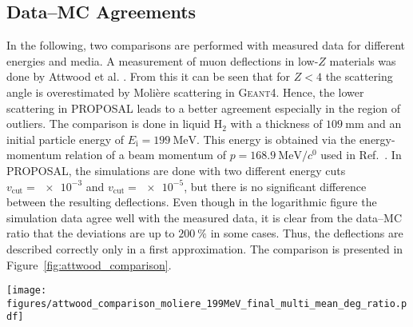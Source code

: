\subsection{Data--MC Agreements}
In the following, two comparisons are performed with measured data for 
different energies and media.
A measurement of muon deflections in low-$Z$ materials was done by Attwood et al. \cite{attwood_2006}. 
From this it can be seen that for $Z < 4$ the scattering angle is overestimated 
by Molière scattering in \textsc{Geant4}. Hence, the lower scattering in PROPOSAL leads 
to a better agreement especially in the region of outliers. The comparison is 
done in liquid $\text{H}_2$ with a thickness of $\SI{109}{\milli\meter}$ and an 
initial particle energy of $E_{\mathrm{i}} = \SI{199}{\mega\electronvolt}$. 
This energy is obtained via the energy-momentum relation of 
a beam momentum of $p = \SI[per-mode=symbol]{168.9}{\mega\electronvolt\per\clight}$
used in Ref.~\cite{attwood_2006}. 
In PROPOSAL, the simulations are done with two different energy cuts $v_{\mathrm{cut}} = \num{e-3}$ and $v_{\mathrm{cut}} = \num{e-5}$, 
but there is no significant difference between the resulting deflections.
Even though in the logarithmic figure the simulation data agree well 
with the measured data, it is clear from the data--MC ratio that the deviations 
are up to $\SI{200}{\percent}$ in some cases. Thus, the deflections are described 
correctly only in a first approximation.
The comparison is presented in Figure~\ref{fig:attwood_comparison}.

\begin{figure*}
    \centering 
    \texttt{[image: figures/attwood\_comparison\_moliere\_199MeV\_final\_multi\_mean\_deg\_ratio.pdf]}
    \caption{
    Muons are 
    propagated with $E_{\mathrm{i}} = \SI{199}{\mega\electronvolt}$ through 
    $\SI{109}{\milli\meter}$ of liquid $\text{H}_2$.
    Measured data of Attwood et al. and simulation data of \textsc{Geant4} are taken from Ref.~\cite{attwood_2006}.    
    The figure presents 
    the normalized counts in dependence of the projected scattering angle $\theta_{\mathrm{y}}$ in degree.
    In PROPOSAL, $100$ simulations each with $\num{e5}$ muons are performed for two different settings using the energy cut 
    $v_{\mathrm{cut}} = \num{e-5}$. The blue points present the mean of the simulations considering
    stochastic deflections and Molière scattering (MSM), the orange 
    points
    present the mean of the simulations taking into account only Molière scattering.   
    The uncertainties on the $x$--axis result due to the measured bin widths. The $y$--uncertainties are the standard deviations.   
    The deflections are  
    underestimated in PROPOSAL, except at $\theta_{\mathrm{y}} \approx 
    \SI{0}{\degree}$ and at $\theta_{\mathrm{y}} \approx 
    \SI{3}{\degree}$. At deflections $\SI{2}{\degree} < \theta_{\mathrm{y}} < \SI{5}{\degree}$, 
    the result seems to be more accurate than \textsc{Geant4}'s. The consideration of the stochastic deflections shows no significant influence.}
    \label{fig:attwood_comparison}
\end{figure*}

